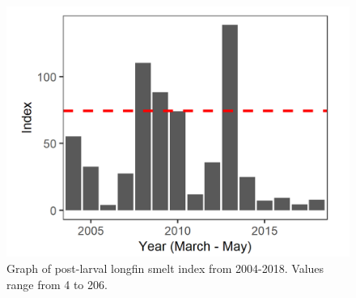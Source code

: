 \documentclass[
]{book}
\begin{document}
\begin{panel-grid}
\begin{columns-nocenter}
\begin{column800}
\begin{expand}
\end{expand}

\end{column800}

\begin{column40}

~

\end{column40}

\begin{column800}

\begin{expand}

\begin{figure}
\includegraphics[width=15.25in]{figures/20mm_LFS_recent} \caption{Graph of post-larval longfin smelt index from 2004-2018. Values range from 4 to 206.}\label{fig:unnamed-chunk-44}
\end{figure}

\end{expand}

\end{column800}

\begin{column40}

~

\end{column40}

\begin{column800}

\begin{expand}


\end{expand}
\end{column800}
\end{columns-nocenter}
\end{panel-grid}
\end{document}
